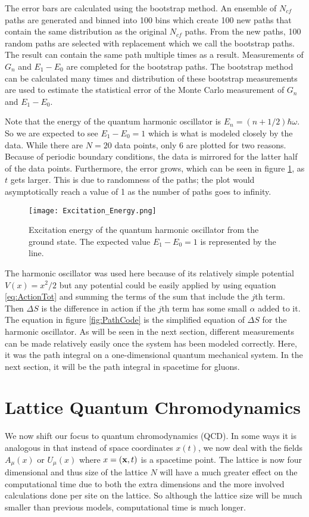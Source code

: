 \documentclass[11pt]{article}
\begin{document}
The error bars are calculated using the bootstrap method. An ensemble of $N_{cf}$ paths are generated and binned into 100 bins which create 100 new paths that contain the same distribution as the original $N_{cf}$ paths. From the new paths, 100 random paths are selected with replacement which we call the bootstrap paths. The result can contain the same path multiple times as a result. Measurements of $G_n$ and $E_1-E_0$ are completed for the bootstrap paths. The bootstrap method can be calculated many times and distribution of these bootstrap measurements are used to estimate the statistical error of the Monte Carlo measurement of $G_n$ and $E_1-E_0$.

Note that the energy of the quantum harmonic oscillator is $E_n=(n+1/2)\hbar\omega$. So we are expected to see $E_1-E_0=1$ which is what is modeled closely by the data. While there are $N=20$ data points, only 6 are plotted for two reasons. Because of periodic boundary conditions, the data is mirrored for the latter half of the data points. Furthermore, the error grows, which can be seen in figure \ref{fig:ExciteE}, as $t$ gets larger. This is due to randomness of the paths; the plot would asymptotically reach a value of 1 as the number of paths goes to infinity.

\begin{figure}[h]
	\centering
	\texttt{[image: Excitation\_Energy.png]}
	\caption{Excitation energy of the quantum harmonic oscillator from the ground state. The expected value $E_1-E_0=1$ is represented by the line.}
	\label{fig:ExciteE}
\end{figure}

The harmonic oscillator was used here because of its relatively simple potential $V(x)=x^2/2$ but any potential could be easily applied by using equation \ref{eq:ActionTot} and summing the terms of the sum that include the $j$th term. Then $\Delta S$ is the difference in action if the $j$th term has some small $\alpha$ added to it. The equation in figure \ref{fig:PathCode} is the simplified equation of $\Delta S$ for the harmonic oscillator. As will be seen in the next section, different measurements can be made relatively easily once the system has been modeled correctly. Here, it was the path integral on a one-dimensional quantum mechanical system. In the next section, it will be the path integral in spacetime for gluons.

\section{Lattice Quantum Chromodynamics}
We now shift our focus to quantum chromodynamics (QCD). In some ways it is analogous in that instead of space coordinates $x(t)$, we now deal with the fields $A_\mu(x)$ or $U_\mu(x)$ where $x=(\vb{x},t)$ is a spacetime point. The lattice is now four dimensional and thus size of the lattice $N$ will have a much greater effect on the computational time due to both the extra dimensions and the more involved calculations done per site on the lattice. So although the lattice size will be much smaller than previous models, computational time is much longer.
\end{document}
